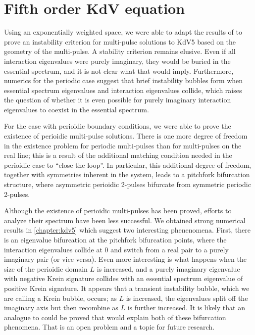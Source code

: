 \documentclass[thesis2.tex]{subfiles}
\begin{document}
\section{Fifth order KdV equation}

Using an exponentially weighted space, we were able to adapt the results of \cite{Sandstede1998} to prove an instability criterion for multi-pulse solutions to KdV5 based on the geometry of the multi-pulse. A stability criterion remains elusive. Even if all interaction eigenvalues were purely imaginary, they would be buried in the essential spectrum, and it is not clear what that would imply. Furthermore, numerics for the periodic case suggest that brief instability bubbles form when essential spectrum eigenvalues and interaction eigenvalues collide, which raises the question of whether it is even possible for purely imaginary interaction eigenvalues to coexist in the essential spectrum.

For the case with perioidic boundary conditions, we were able to prove the existence of perioidic multi-pulse solutions. There is one more degree of freedom in the existence problem for periodic multi-pulses than for multi-pulses on the real line; this is a result of the additional matching condition needed in the perioidic case to ``close the loop''. In particular, this additional degree of freedom, together with symmetries inherent in the system, leads to a pitchfork bifurcation structure, where asymmetric perioidic 2-pulses bifurcate from symmetric periodic 2-pulses. 

Although the existence of perioidic multi-pulses has been proved, efforts to analyze their spectrum have been less successful. We obtained strong numerical results in \cref{chapter:kdv5} which suggest two interesting phenenomena. First, there is an eigenvalue bifurcation at the pitchfork bifurcation points, where the interaction eigenvalues collide at 0 and switch from a real pair to a purely imaginary pair (or vice versa). Even more interesting is what happens when the size of the perioidic domain $L$ is increased, and a purely imaginary eigenvalue with negative Krein signature collides with an essential spectrum eigenvalue of positive Krein signature. It appears that a transient instability bubble, which we are calling a Krein bubble, occurs; as $L$ is increased, the eigenvalues split off the imaginary axis but then recombine as $L$ is further increased. It is likely that an analogue to \cite[Theorem 2]{Sandstede1998} could be proved that would explain both of these bifurcation phenomena. That is an open problem and a topic for future research.

\iffulldocument\else
	
	
\fi
\end{document}

